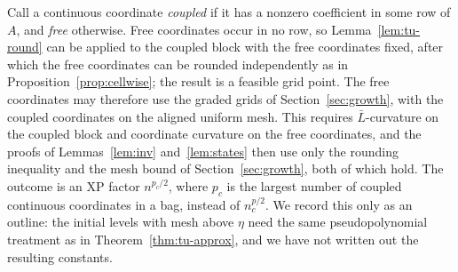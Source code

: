 \begin{remark}\label{rem:tu-hybrid}
Call a continuous coordinate \emph{coupled} if it has a nonzero coefficient in
some row of $A$, and \emph{free} otherwise. Free coordinates occur in no
row, so Lemma~\ref{lem:tu-round} can be applied to the coupled block with the
free coordinates fixed, after which the free coordinates can be rounded
independently as in Proposition~\ref{prop:cellwise}; the result is a feasible grid
point. The free coordinates may therefore use the graded grids of
Section~\ref{sec:growth}, with the coupled coordinates on the aligned
uniform mesh. This requires $\bar L$-curvature on the coupled block and
coordinate curvature on the free coordinates, and the proofs of
Lemmas~\ref{lem:inv} and~\ref{lem:states} then use only the rounding
inequality and the mesh bound of Section~\ref{sec:growth}, both of which hold.
The outcome is an XP factor $n^{p_c/2}$, where $p_c$ is the largest number of
coupled continuous coordinates in a bag, instead of $n_c^{p/2}$. We record this
only as an outline: the initial levels with mesh above $\eta$ need the same
pseudopolynomial treatment as in Theorem~\ref{thm:tu-approx}, and we have not
written out the resulting constants.
\end{remark}

